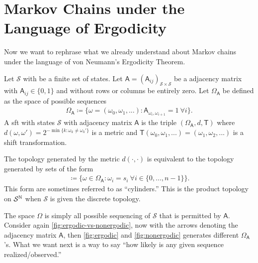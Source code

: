 \documentclass[a4paper]{article}
\begin{document}
\section{Markov Chains under the Language of Ergodicity}

Now we want to rephrase what we already understand about Markov chains under the language of von Neumann's Ergodicity Theorem.

\begin{definition}
	Let $\mathcal{S}$ with be a finite set of states.
	Let $\mathsf{A}=(\mathsf{A}_{ij})_{\mathcal{S}\times\mathcal{S}}$
	be a adjacency matrix with $\mathsf{A}_{ij}\in\{0,1\}$ and without rows or columns be entirely zero.
	Let $\Omega_{\mathsf{A}}$ be defined as the space of possible sequences
	\begin{align*}
		\Omega_{\mathsf{A}} \coloneqq \{\omega=(\omega_0,\omega_1,...):\mathsf{A}_{\omega_i,\omega_{i+1}}=1\ \forall i\}.
	\end{align*}
	A \gls{sft} with states $\mathcal{S}$ with adjacency matrix $\mathsf{A}$ is the triple $(\Omega_{\mathsf{A}},d,\mathsf{T})$
	where $d(\omega,\omega')=2^{-\min\{k:\omega_k\neq\omega_k'\}}$ is a metric
	and $\mathsf{T}(\omega_0,\omega_1,...)=(\omega_1,\omega_2,...)$ is a shift transformation.
\end{definition}

\begin{remark}
	The topology generated by the metric $d(\cdot,\cdot)$ is equivalent to the topology generated by
	sets of the form
	\begin{align*}
		[s_0,...,s_{n-1}] \coloneqq \{\omega\in\Omega_{\mathsf{A}}:\omega_i=s_i\ \forall i\in\{0,...,n-1\}\}.
	\end{align*}
	This form are sometimes referred to as ``cylinders.''
	This is the product topology on $\mathcal{S}^{\mathbb{N}}$ when $\mathcal{S}$ is given the discrete topology.
\end{remark}

\begin{remark}
	The space $\Omega$ is simply all possible sequencing of $\mathcal{S}$ that is permitted by $\mathsf{A}$.
	Consider again \autoref{fig:ergodic-vs-nonergodic}, now with the arrows denoting the adjacency matrix $\mathsf{A}$,
	then \autoref{fig:ergodic} and \autoref{fig:nonergodic} generates different $\Omega_{\mathsf{A}}$'s.
	What we want next is a way to say ``how likely is any given sequence realized/observed.''
\end{remark}
\end{document}
